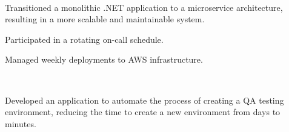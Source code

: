 \documentclass[]{hieudo-build}
\begin{document}
\begin{minipage}[t]{0.69\textwidth}
\sectionsep

\\
\begin{tightemize}
\item Transitioned a monolithic .NET application to a microservice architecture, resulting in a more scalable and maintainable system.
\item Participated in a rotating on-call schedule.
\item Managed weekly deployments to AWS infrastructure.
\end{tightemize}

\sectionsep

 \\
\begin{tightemize}
\item Developed an application to automate the process of creating a QA testing environment, reducing the time to create a new environment from days to minutes.
\end{tightemize}


\sectionsep



\end{minipage} 





\end{document}
